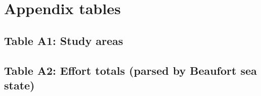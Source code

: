 \documentclass[
]{book}
\begin{document}
\hypertarget{appendix-tables}{%
\section*{Appendix tables}\label{appendix-tables}}

\hypertarget{table-a1-study-areas}{%
\subsection*{Table A1: Study areas}\label{table-a1-study-areas}}

\hypertarget{table-a2-effort-totals-parsed-by-beaufort-sea-state}{%
\subsection*{Table A2: Effort totals (parsed by Beaufort sea state)}\label{table-a2-effort-totals-parsed-by-beaufort-sea-state}}
\end{document}
